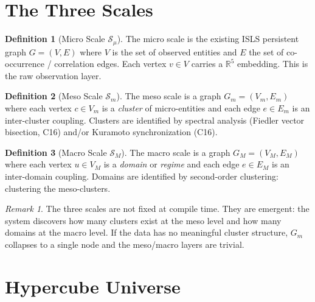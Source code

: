 \documentclass[11pt,a4paper,twoside]{article}
\theoremstyle{definition}
\newtheorem{definition}{Definition}[section]
\theoremstyle{plain}
\theoremstyle{remark}
\newtheorem{remark}{Remark}[section]
\newcommand{\ISLS}{\textsf{ISLS}}
\newcommand{\RR}{\mathbb{R}}
\newcommand{\calS}{\mathcal{S}}
\begin{document}
\section{The Three Scales}\label{sec:threescales}

\begin{definition}[Micro Scale $\calS_\mu$]\label{def:micro}
The micro scale is the existing \ISLS{} persistent graph $G = (V, E)$
where $V$ is the set of observed entities and $E$ the set of
co-occurrence / correlation edges. Each vertex $v \in V$ carries a
$\RR^5$ embedding. This is the raw observation layer.
\end{definition}

\begin{definition}[Meso Scale $\calS_m$]\label{def:meso}
The meso scale is a graph $G_m = (V_m, E_m)$ where each vertex
$c \in V_m$ is a \emph{cluster} of micro-entities and each edge
$e \in E_m$ is an inter-cluster coupling. Clusters are identified by
spectral analysis (Fiedler vector bisection, C16) and/or Kuramoto
synchronization (C16).
\end{definition}

\begin{definition}[Macro Scale $\calS_M$]\label{def:macro}
The macro scale is a graph $G_M = (V_M, E_M)$ where each vertex
$u \in V_M$ is a \emph{domain} or \emph{regime} and each edge
$e \in E_M$ is an inter-domain coupling. Domains are identified by
second-order clustering: clustering the meso-clusters.
\end{definition}

\begin{remark}
The three scales are not fixed at compile time. They are emergent: the
system discovers how many clusters exist at the meso level and how many
domains at the macro level. If the data has no meaningful cluster
structure, $G_m$ collapses to a single node and the meso/macro layers
are trivial.
\end{remark}


\section{Hypercube Universe}\label{sec:hypercube}
\end{document}

